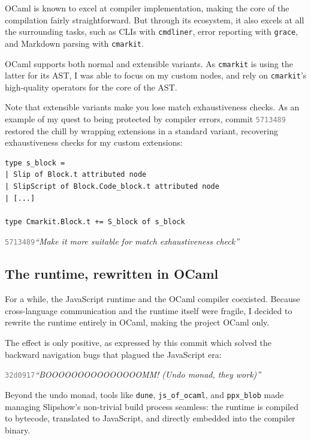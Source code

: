 \documentclass[10pt,a4paper]{article}
\newcommand{\commit}[1]{\texttt{\textcolor{gray}{#1}}}
\newcommand{\gitquote}[2]{\medskip\texttt{\textcolor{gray}{#1}}\quad\emph{``#2''}\medskip}
\begin{document}
OCaml is known to excel at compiler implementation, making the core of the
compilation fairly straightforward. But through its ecosystem, it also excels at
all the surrounding tasks, such as CLIs with \texttt{cmdliner}, error reporting
with \texttt{grace}, and Markdown parsing with \texttt{cmarkit}.

OCaml supports both normal and extensible variants. As \texttt{cmarkit} is using
the latter for its AST, I was able to focus on my custom nodes, and rely on
\texttt{cmarkit}'s high-quality operators for the core of the AST.

Note that extensible variants make you lose match exhaustiveness checks. As an
example of my quest to being protected by compiler errors, commit
\commit{5713489} restored the chill by wrapping extensions in a standard
variant, recovering exhaustiveness checks for my custom extensions:

\begin{verbatim}
type s_block =
| Slip of Block.t attributed node
| SlipScript of Block.Code_block.t attributed node
| [...]

type Cmarkit.Block.t += S_block of s_block
\end{verbatim}

\gitquote{5713489}{Make it more suitable for match exhaustiveness check}

\subsection{The runtime, rewritten in OCaml}

For a while, the JavaScript runtime and the OCaml compiler coexisted. Because
cross-language communication and the runtime itself were fragile, I decided to
rewrite the runtime entirely in OCaml, making the project OCaml only.

The effect is only positive, as expressed by this commit which solved the
backward navigation bugs that plagued the JavaScript era:

\gitquote{32d0917}{BOOOOOOOOOOOOOOOMM! (Undo monad, they work)}

Beyond the undo monad, tools like \texttt{dune}, \texttt{js\_of\_ocaml}, and
\texttt{ppx\_blob} made managing Slipshow's non-trivial build process seamless:
the runtime is compiled to bytecode, translated to JavaScript, and directly
embedded into the compiler binary.
\end{document}
